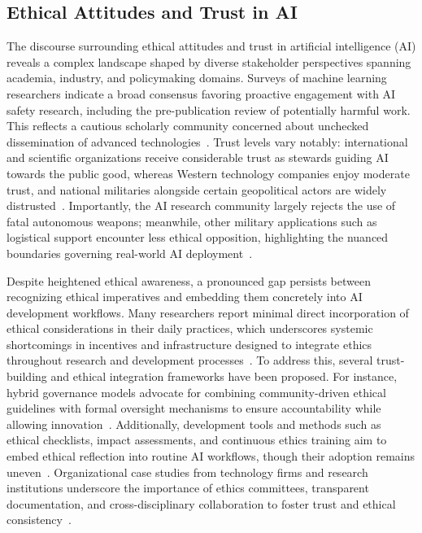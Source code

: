 \documentclass[sigconf]{acmart}
\begin{document}
\subsection{Ethical Attitudes and Trust in AI}

The discourse surrounding ethical attitudes and trust in artificial intelligence (AI) reveals a complex landscape shaped by diverse stakeholder perspectives spanning academia, industry, and policymaking domains. Surveys of machine learning researchers indicate a broad consensus favoring proactive engagement with AI safety research, including the pre-publication review of potentially harmful work. This reflects a cautious scholarly community concerned about unchecked dissemination of advanced technologies~\cite{ref9,ref25}. Trust levels vary notably: international and scientific organizations receive considerable trust as stewards guiding AI towards the public good, whereas Western technology companies enjoy moderate trust, and national militaries alongside certain geopolitical actors are widely distrusted~\cite{ref9,ref25}. Importantly, the AI research community largely rejects the use of fatal autonomous weapons; meanwhile, other military applications such as logistical support encounter less ethical opposition, highlighting the nuanced boundaries governing real-world AI deployment~\cite{ref9,ref25}.

Despite heightened ethical awareness, a pronounced gap persists between recognizing ethical imperatives and embedding them concretely into AI development workflows. Many researchers report minimal direct incorporation of ethical considerations in their daily practices, which underscores systemic shortcomings in incentives and infrastructure designed to integrate ethics throughout research and development processes~\cite{ref9,ref25}. To address this, several trust-building and ethical integration frameworks have been proposed. For instance, hybrid governance models advocate for combining community-driven ethical guidelines with formal oversight mechanisms to ensure accountability while allowing innovation~\cite{ref25}. Additionally, development tools and methods such as ethical checklists, impact assessments, and continuous ethics training aim to embed ethical reflection into routine AI workflows, though their adoption remains uneven~\cite{ref25,ref36}. Organizational case studies from technology firms and research institutions underscore the importance of ethics committees, transparent documentation, and cross-disciplinary collaboration to foster trust and ethical consistency~\cite{ref25}.
\end{document}
